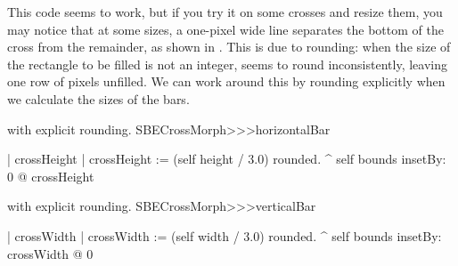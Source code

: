 \documentclass[a4paper,10pt,twoside]{book}
\begin{document}
This code seems to work, but if you try it on some crosses and resize them, you may notice that at some sizes, a one-pixel wide line separates the bottom of the cross from the remainder, as shown in .
This is due to rounding: when the size of the rectangle to be filled is not an integer, 
seems to round inconsistently, leaving one row of pixels unfilled.
We can work around this by rounding explicitly when we calculate the sizes of the bars.

\begin{method}{ with explicit rounding.}
SBECrossMorph>>>horizontalBar

	| crossHeight |
	crossHeight := (self height / 3.0) rounded.
	^ self bounds insetBy: 0 @ crossHeight
\end{method}

\begin{method}{ with explicit rounding.}
SBECrossMorph>>>verticalBar

	| crossWidth |
	crossWidth := (self width / 3.0) rounded.
	^ self bounds insetBy: crossWidth @ 0
\end{method}








\end{document}
